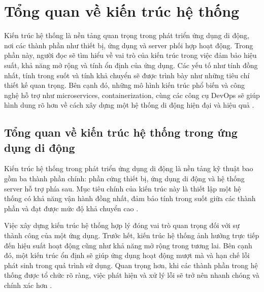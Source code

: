 
\section{Tổng quan về kiến trúc hệ thống}
\begin{flushleft}
    \hspace*{0.8cm}Kiến trúc hệ thống là nền tảng quan trọng trong phát triển ứng dụng di động, nơi các thành phần như thiết bị, ứng dụng và server phối hợp hoạt động. Trong phần này, người đọc sẽ tìm hiểu về vai trò của kiến trúc trong việc đảm bảo hiệu suất, khả năng mở rộng và tính ổn định của ứng dụng. Các yếu tố như tính đồng nhất, tính trong suốt và tính khả chuyển sẽ được trình bày như những tiêu chí thiết kế quan trọng. Bên cạnh đó, những mô hình kiến trúc phổ biến và công nghệ hỗ trợ như microservices, containerization, cùng các công cụ DevOps sẽ giúp hình dung rõ hơn về cách xây dựng một hệ thống di động hiện đại và hiệu quả \cite{microservices}.
\end{flushleft}
    \subsection{Tổng quan về kiến trúc hệ thống trong ứng dụng di động}
    \renewcommand{\labelitemi}{--}    
    \begin{flushleft}
            \hspace*{0.8cm}Kiến trúc hệ thống trong phát triển ứng dụng di động là nền tảng kỹ thuật bao gồm ba thành phần chính: phần cứng thiết bị, ứng dụng di động và hệ thống server hỗ trợ phía sau. Mục tiêu chính của kiến trúc này là thiết lập một hệ thống có khả năng vận hành đồng nhất, đảm bảo tính trong suốt giữa các thành phần và đạt được mức độ khả chuyển cao \cite{restgraphql}.
    \end{flushleft}

    \begin{flushleft}
        \hspace*{0.8cm}Việc xây dựng kiến trúc hệ thống hợp lý đóng vai trò quan trọng đối với sự thành công của một ứng dụng. Trước hết, kiến trúc hệ thống ảnh hưởng trực tiếp đến hiệu suất hoạt động cũng như khả năng mở rộng trong tương lai. Bên cạnh đó, một kiến trúc ổn định sẽ giúp ứng dụng hoạt động mượt mà và hạn chế lỗi phát sinh trong quá trình sử dụng. Quan trọng hơn, khi các thành phần trong hệ thống được tổ chức rõ ràng, việc phát hiện và xử lý lỗi sẽ trở nên nhanh chóng và chính xác hơn \cite{firebasecrashlytics}.
    \end{flushleft}

